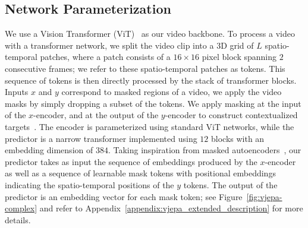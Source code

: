 \documentclass[twocolumn]{fairmeta}
\theoremstyle{plain}
\theoremstyle{definition}
\theoremstyle{remark}
\begin{document}
\subsection{Network Parameterization}
We use a Vision Transformer (ViT)~\citep{dosovitskiy2020image,arnab2021vivit} as our video backbone.
To process a video with a transformer network, we split the video clip into a 3D grid of $L$ spatio-temporal patches, where a patch consists of a $16\times16$ pixel block spanning $2$ consecutive frames; we refer to these spatio-temporal patches as tokens.
This sequence of tokens is then directly processed by the stack of transformer blocks.
Inputs $x$ and $y$ correspond to masked regions of a video, we apply the video masks by simply dropping a subset of the tokens.
We apply masking at the input of the $x$-encoder, and at the output of the $y$-encoder to construct contextualized targets~\citep{baevski2022data2vec}.
The encoder is parameterized using standard ViT networks, while the predictor is a narrow transformer implemented using $12$ blocks with an embedding dimension of $384$.
Taking inspiration from masked autoencoders~\citep{he2021masked}, our predictor takes as input the sequence of embeddings produced by the $x$-encoder as well as a sequence of learnable mask tokens with positional embeddings indicating the spatio-temporal positions of the $y$ tokens.
The output of the predictor is an embedding vector for each mask token; see Figure~\ref{fig:vjepa-complex} and refer to Appendix~\ref{appendix:vjepa_extended_description} for more details.
\end{document}
